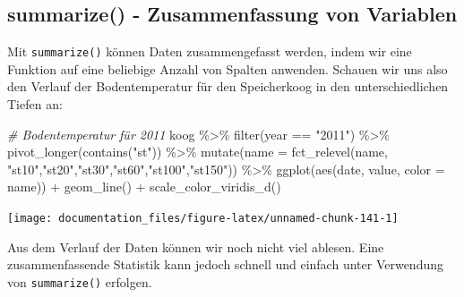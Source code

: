 \documentclass[
]{article}
\newenvironment{Shaded}{\begin{snugshade}}{\end{snugshade}}
\newcommand{\AttributeTok}[1]{\textcolor[rgb]{0.77,0.63,0.00}{#1}}
\newcommand{\CommentTok}[1]{\textcolor[rgb]{0.56,0.35,0.01}{\textit{#1}}}
\newcommand{\FunctionTok}[1]{\textcolor[rgb]{0.00,0.00,0.00}{#1}}
\newcommand{\NormalTok}[1]{#1}
\newcommand{\SpecialCharTok}[1]{\textcolor[rgb]{0.00,0.00,0.00}{#1}}
\newcommand{\StringTok}[1]{\textcolor[rgb]{0.31,0.60,0.02}{#1}}
\begin{document}
\hypertarget{summarize---zusammenfassung-von-variablen}{%
\subsection{summarize() - Zusammenfassung von Variablen}\label{summarize---zusammenfassung-von-variablen}}

Mit \texttt{summarize()} können Daten zusammengefasst werden, indem wir eine Funktion auf eine beliebige Anzahl von Spalten anwenden. Schauen wir uns also den Verlauf der Bodentemperatur für den Speicherkoog in den unterschiedlichen Tiefen an:

\begin{Shaded}
\begin{Highlighting}[]
\CommentTok{\# Bodentemperatur für 2011}
\NormalTok{koog }\SpecialCharTok{\%\textgreater{}\%}
  \FunctionTok{filter}\NormalTok{(year }\SpecialCharTok{==} \StringTok{"2011"}\NormalTok{) }\SpecialCharTok{\%\textgreater{}\%}
  \FunctionTok{pivot\_longer}\NormalTok{(}\FunctionTok{contains}\NormalTok{(}\StringTok{"st"}\NormalTok{)) }\SpecialCharTok{\%\textgreater{}\%}
  \FunctionTok{mutate}\NormalTok{(}\AttributeTok{name =} \FunctionTok{fct\_relevel}\NormalTok{(name, }\StringTok{"st10"}\NormalTok{,}\StringTok{"st20"}\NormalTok{,}\StringTok{"st30"}\NormalTok{,}\StringTok{"st60"}\NormalTok{,}\StringTok{"st100"}\NormalTok{,}\StringTok{"st150"}\NormalTok{)) }\SpecialCharTok{\%\textgreater{}\%}
  \FunctionTok{ggplot}\NormalTok{(}\FunctionTok{aes}\NormalTok{(date, value, }\AttributeTok{color =}\NormalTok{ name)) }\SpecialCharTok{+}
  \FunctionTok{geom\_line}\NormalTok{() }\SpecialCharTok{+}
  \FunctionTok{scale\_color\_viridis\_d}\NormalTok{()}
\end{Highlighting}
\end{Shaded}

\begin{center}\texttt{[image: documentation\_files/figure-latex/unnamed-chunk-141-1]} \end{center}

Aus dem Verlauf der Daten können wir noch nicht viel ablesen. Eine zusammenfassende Statistik kann jedoch schnell und einfach unter Verwendung von \texttt{summarize()} erfolgen.
\end{document}
